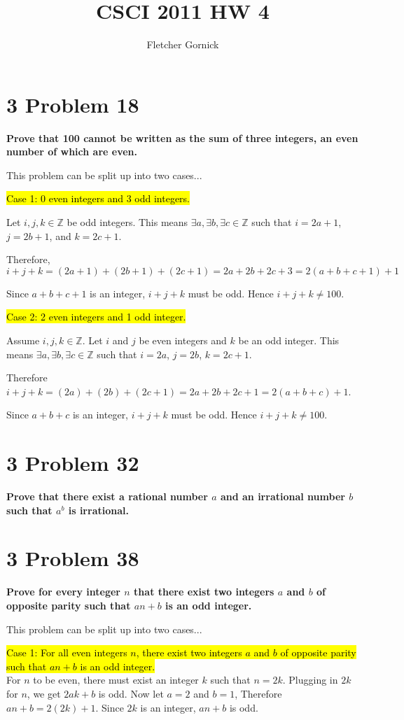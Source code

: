 \documentclass[10pt]{article}
\title{CSCI 2011 HW 4}
\author{Fletcher Gornick}
\def \n {\par \vspace{\baselineskip}}
\begin{document}
\maketitle

\section{3 Problem 18}
\textbf{Prove that 100 cannot be written as the sum of three integers, an even number of which are even.}

\n
This problem can be split up into two cases...
\n
\hl{Case 1: 0 even integers and 3 odd integers.}

Let $i,j,k \in \mathbb{Z}$ be odd integers.  This means $\exists a, \exists b, \exists c \in \mathbb{Z}$
such that $i = 2a + 1$, $j = 2b + 1$, and $k = 2c + 1$. 

Therefore, $i + j + k = (2a+1) + (2b+1) + (2c+1) = 2a + 2b + 2c + 3 = 2(a + b + c + 1) + 1$

Since $a + b + c + 1$ is an integer, $i + j + k$ must be odd.  Hence $i + j + k \not= 100$.

\n
\hl{Case 2: 2 even integers and 1 odd integer.}

Assume $i,j,k \in \mathbb{Z}$.  Let $i$ and $j$ be even integers and $k$ be an odd integer.  This means
$\exists a, \exists b, \exists c \in \mathbb{Z}$ such that $i = 2a$, $j = 2b$, $k = 2c + 1$.

Therefore $i + j + k = (2a) + (2b) + (2c+1) = 2a + 2b + 2c + 1 = 2(a + b + c) + 1$.

Since $a + b + c$ is an integer, $i + j + k$ must be odd.  Hence $i + j + k \not= 100$.



\section{3 Problem 32}
\textbf{Prove that there exist a rational number $a$ and an irrational number $b$ such that $a^b$ is irrational.}


\section{3 Problem 38}
\textbf{Prove for every integer $n$ that there exist two integers $a$ and $b$ of opposite parity such that $an + b$ is an odd integer.}

\n
This problem can be split up into two cases... 
\n\hl{Case 1: For all even integers $n$, there exist two integers $a$ and $b$ of opposite parity such that $an + b$ is an odd integer.} \\
For $n$ to be even, there must exist an integer $k$ such that $n = 2k$. 
Plugging in $2k$ for $n$, we get $2ak + b$ is odd.  Now let $a = 2$ and $b = 1$, 
Therefore $an + b = 2(2k) + 1$.  Since $2k$ is an integer, $an + b$ is odd.
\end{document}
